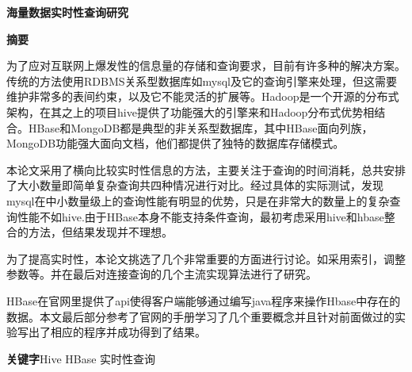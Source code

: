 \newpage
\begin{center}
	\heiti{}\textbf{海量数据实时性查询研究}
\end{center}
\begin{center}
	\heiti{}\textbf{摘\quad 要}
\end{center}
\vspace{2.5mm}
\songti{}

为了应对互联网上爆发性的信息量的存储和查询要求，目前有许多种的解决方案。传统的方法使用RDBMS关系型数据库如mysql及它的查询引擎来处理，但这需要维护非常多的表间约束，以及它不能灵活的扩展等。Hadoop是一个开源的分布式架构，在其之上的项目hive提供了功能强大的引擎来和Hadoop分布式优势相结合。HBase和MongoDB都是典型的非关系型数据库，其中HBase面向列族，MongoDB功能强大面向文档，他们都提供了独特的数据库存储模式。

本论文采用了横向比较实时性信息的方法，主要关注于查询的时间消耗，总共安排了大小数量即简单复杂查询共四种情况进行对比。经过具体的实际测试，发现mysql在中小数量级上的查询性能有明显的优势，只是在非常大的数量上的复杂查询性能不如hive.由于HBase本身不能支持条件查询，最初考虑采用hive和hbase整合的方法，但结果发现并不理想。

为了提高实时性，本论文挑选了几个非常重要的方面进行讨论。如采用索引，调整参数等。并在最后对连接查询的几个主流实现算法进行了研究。

HBase在官网里提供了api使得客户端能够通过编写java程序来操作Hbase中存在的数据。本文最后部分参考了官网的手册学习了几个重要概念并且针对前面做过的实验写出了相应的程序并成功得到了结果。

\vspace{3mm}
\heiti\textbf{关键字}\quad \songti Hive \quad HBase \quad 实时性查询